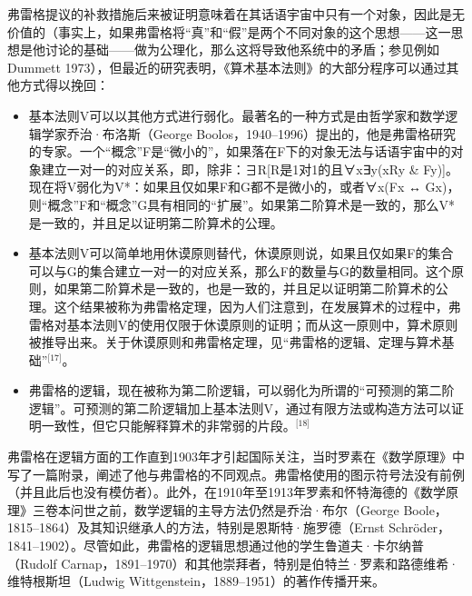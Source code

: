 弗雷格提议的补救措施后来被证明意味着在其话语宇宙中只有一个对象，因此是无价值的（事实上，如果弗雷格将“真”和“假”是两个不同对象的这个思想——这一思想是他讨论的基础——做为公理化，那么这将导致他系统中的矛盾；参见例如Dummett 1973），但最近的研究表明，《算术基本法则》的大部分程序可以通过其他方式得以挽回：
\begin{itemize}
\item 基本法则V可以以其他方式进行弱化。最著名的一种方式是由哲学家和数学逻辑学家乔治·布洛斯（George Boolos，1940–1996）提出的，他是弗雷格研究的专家。一个“概念”F是“微小的”，如果落在F下的对象无法与话语宇宙中的对象建立一对一的对应关系，即，除非：∃R[R是1对1的且∀x∃y(xRy & Fy)]。现在将V弱化为V*：如果且仅如果F和G都不是微小的，或者∀x(Fx ↔ Gx)，则“概念”F和“概念”G具有相同的“扩展”。如果第二阶算术是一致的，那么V*是一致的，并且足以证明第二阶算术的公理。
\item 基本法则V可以简单地用休谟原则替代，休谟原则说，如果且仅如果F的集合可以与G的集合建立一对一的对应关系，那么F的数量与G的数量相同。这个原则，如果第二阶算术是一致的，也是一致的，并且足以证明第二阶算术的公理。这个结果被称为弗雷格定理，因为人们注意到，在发展算术的过程中，弗雷格对基本法则V的使用仅限于休谟原则的证明；而从这一原则中，算术原则被推导出来。关于休谟原则和弗雷格定理，见“弗雷格的逻辑、定理与算术基础”\(^\text{[17]}\)。
\item 弗雷格的逻辑，现在被称为第二阶逻辑，可以弱化为所谓的“可预测的第二阶逻辑”。可预测的第二阶逻辑加上基本法则V，通过有限方法或构造方法可以证明一致性，但它只能解释算术的非常弱的片段。\(^\text{[18]}\)
\end{itemize}
弗雷格在逻辑方面的工作直到1903年才引起国际关注，当时罗素在《数学原理》中写了一篇附录，阐述了他与弗雷格的不同观点。弗雷格使用的图示符号法没有前例（并且此后也没有模仿者）。此外，在1910年至1913年罗素和怀特海德的《数学原理》三卷本问世之前，数学逻辑的主导方法仍然是乔治·布尔（George Boole，1815–1864）及其知识继承人的方法，特别是恩斯特·施罗德（Ernst Schröder，1841–1902）。尽管如此，弗雷格的逻辑思想通过他的学生鲁道夫·卡尔纳普（Rudolf Carnap，1891–1970）和其他崇拜者，特别是伯特兰·罗素和路德维希·维特根斯坦（Ludwig Wittgenstein，1889–1951）的著作传播开来。
